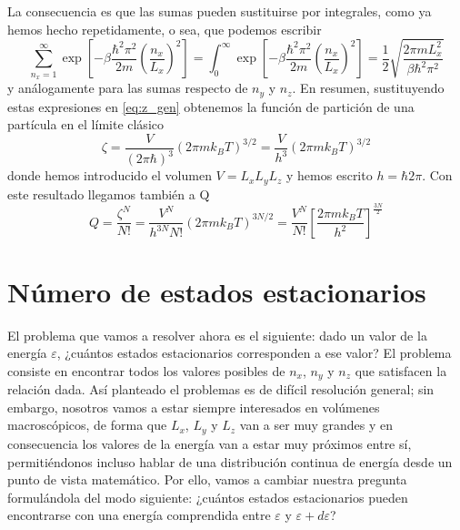 La consecuencia es que las sumas pueden sustituirse por integrales, como ya hemos hecho repetidamente, o sea, que podemos escribir
\begin{equation}
	\sum_{n_x=1}^{\infty} \exp \left[ -\beta \frac{\hbar^2 \pi^2}{2m} \left( \frac{n_x}{L_x} \right)^2 \right] = \int_{0}^{\infty} \exp \left[ -\beta \frac{\hbar^2 \pi^2}{2m} \left( \frac{n_x}{L_x} \right)^2 \right] = \frac{1}{2}\sqrt{\frac{2\pi m L_x^2}{\beta \hbar^2 \pi^2}}
\end{equation}
y análogamente para las sumas respecto de $n_y$ y $n_z$.
En resumen, sustituyendo estas expresiones en \eqref{eq:z_gen} obtenemos la función de partición de una partícula en el límite clásico
\begin{equation}
	\zeta = \frac{V}{(2\pi\hbar)^3}(2\pi m k_B T)^{3/2}= \frac{V}{h^3}(2\pi m k_B T)^{3/2}
\end{equation}
donde hemos introducido el volumen $V = L_x L_y L_z$ y hemos escrito $h = \hbar 2 \pi$. Con este resultado llegamos también a Q
\begin{equation}
	Q = \frac{\zeta^N}{N!} = \frac{V^N}{h^{3N}N!}(2\pi m k_B T)^{3N/2} = \frac{V^N}{N!} \left[ \frac{2\pi m k_B T}{h^2}\right] ^{\frac{3N}{2}}
\end{equation}

\section{Número de estados estacionarios}

El problema que vamos a resolver ahora es el siguiente: dado un valor de la energía
$\varepsilon$, ¿cuántos estados estacionarios corresponden a ese valor? 
El problema consiste en encontrar todos los valores posibles de $n_x$, $n_y$ y $n_z$ que satisfacen la relación dada.
Así planteado el problemas es de difícil resolución general; sin embargo, nosotros vamos a estar siempre interesados en volúmenes macroscópicos, de forma que $L_x$, $L_y$ y $L_z$ van a ser muy grandes y en consecuencia los valores de la energía van a estar muy próximos entre sí, permitiéndonos incluso hablar de una distribución continua de energía desde un punto de vista matemático.
Por ello, vamos a cambiar nuestra pregunta formulándola del modo siguiente: ¿cuántos estados estacionarios pueden encontrarse con una energía comprendida entre $\varepsilon$ y $\varepsilon + d\varepsilon$?

